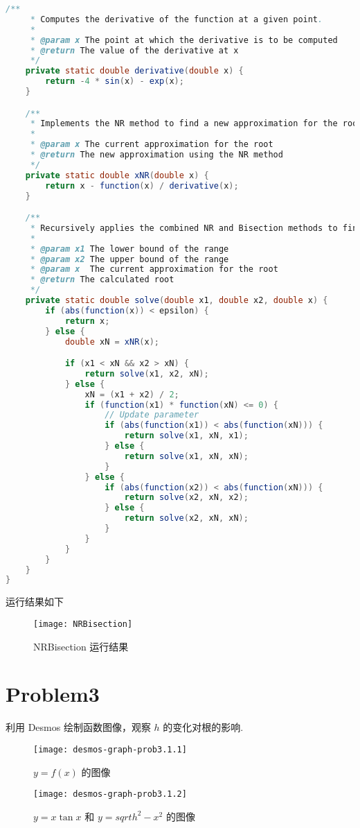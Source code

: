 \documentclass[UTF8]{ctexart}
\begin{document}
\begin{lstlisting}[language=Java, breaklines = true,label={lst:lstlisting2}]
    /**
     * Computes the derivative of the function at a given point.
     *
     * @param x The point at which the derivative is to be computed
     * @return The value of the derivative at x
     */
    private static double derivative(double x) {
        return -4 * sin(x) - exp(x);
    }

    /**
     * Implements the NR method to find a new approximation for the root.
     *
     * @param x The current approximation for the root
     * @return The new approximation using the NR method
     */
    private static double xNR(double x) {
        return x - function(x) / derivative(x);
    }

    /**
     * Recursively applies the combined NR and Bisection methods to find the root.
     *
     * @param x1 The lower bound of the range
     * @param x2 The upper bound of the range
     * @param x  The current approximation for the root
     * @return The calculated root
     */
    private static double solve(double x1, double x2, double x) {
        if (abs(function(x)) < epsilon) {
            return x;
        } else {
            double xN = xNR(x);

            if (x1 < xN && x2 > xN) {
                return solve(x1, x2, xN);
            } else {
                xN = (x1 + x2) / 2;
                if (function(x1) * function(xN) <= 0) {
                    // Update parameter
                    if (abs(function(x1)) < abs(function(xN))) {
                        return solve(x1, xN, x1);
                    } else {
                        return solve(x1, xN, xN);
                    }
                } else {
                    if (abs(function(x2)) < abs(function(xN))) {
                        return solve(x2, xN, x2);
                    } else {
                        return solve(x2, xN, xN);
                    }
                }
            }
        }
    }
}
    \end{lstlisting}
    运行结果如下
    \begin{figure}[h]
        \centering
        \texttt{[image: NRBisection]}
        \caption{NRBisection 运行结果}\label{fig:figure2.2}
    \end{figure}

    \newpage


    \section{Problem3}\label{sec:problem3}
    利用 Desmos 绘制函数图像，观察 \(h\) 的变化对根的影响.
    \begin{figure}[h]
        \centering
        \texttt{[image: desmos-graph-prob3.1.1]}
        \caption{\(y = f(x)\) 的图像}\label{fig:figure3.1}
    \end{figure}
    \begin{figure}[h]
        \centering
        \texttt{[image: desmos-graph-prob3.1.2]}
        \caption{\(y = x \tan{x}\) 和 \(y = sqrt{h^2 - x^2}\) 的图像}\label{fig:figure3.2}
    \end{figure}
\end{document}

